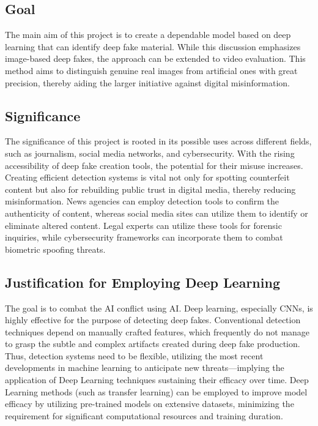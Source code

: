 \documentclass{article} %
\begin{document}
\subsection{Goal}
The main aim of this project is to create a dependable model based on deep learning that can identify deep fake material. While this discussion emphasizes image-based deep fakes, the approach can be extended to video evaluation. 
This method aims to distinguish genuine real images from artificial ones with great precision, thereby aiding the larger initiative against digital misinformation. 

\subsection{Significance}
The significance of this project is rooted in its possible uses across different fields, such as journalism, social media networks, and cybersecurity. With the rising accessibility of deep fake creation tools, the potential for their misuse increases. Creating efficient detection systems is vital not only for spotting counterfeit content but also for rebuilding public trust in digital media, thereby reducing misinformation. News agencies can employ detection tools to confirm the authenticity of content, whereas social media sites can utilize them to identify or eliminate altered content. Legal experts can utilize these tools for forensic inquiries, while cybersecurity frameworks can incorporate them to combat biometric spoofing threats.

\subsection{Justification for Employing Deep Learning}
The goal is to combat the AI conflict using AI. Deep learning, especially CNNs, is highly effective for the purpose of detecting deep fakes. Conventional detection techniques depend on manually crafted features, which frequently do not manage to grasp the subtle and complex artifacts created during deep fake production. Thus, detection systems need to be flexible, utilizing the most recent developments in machine learning to anticipate new threats—implying the application of Deep Learning techniques  sustaining their efficacy over time. Deep Learning methods (such as transfer learning) can be employed to improve model efficacy by utilizing pre-trained models on extensive datasets, minimizing the requirement for significant computational resources and training duration.
\end{document}
